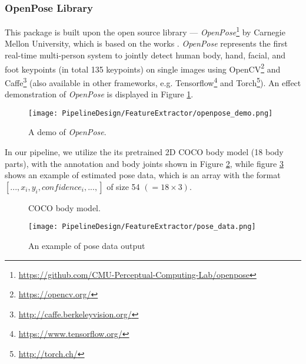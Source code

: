 \subsubsection{OpenPose Library}

This package is built upon the open source library --- \textit{OpenPose}\footnote{\label{git:openpose}\url{https://github.com/CMU-Perceptual-Computing-Lab/openpose}} by Carnegie Mellon University, which is based on the works \cite{cao2017realtime, DBLP:journals/corr/SimonJMS17, journals/corr/WeiRKS16}. \textit{OpenPose} represents the first real-time multi-person system to jointly detect human body, hand, facial, and foot keypoints (in total 135 keypoints) on single images using OpenCV\footnote{\url{https://opencv.org/}} and Caffe\footnote{\url{http://caffe.berkeleyvision.org/}} (also available in other frameworks, e.g. Tensorflow\footnote{\url{https://www.tensorflow.org/}} and Torch\footnote{\url{http://torch.ch/}}). An effect demonstration of \textit{OpenPose} is displayed in Figure \ref{fig:openpose_demo}. 

\begin{figure}[h!]
  \centering
  \texttt{[image: PipelineDesign/FeatureExtractor/openpose\_demo.png]}
  \caption{A demo of \textit{OpenPose}.}
  \label{fig:openpose_demo}
\end{figure} 


In our pipeline, we utilize the its pretrained 2D COCO body model (18 body parts), with the annotation and body joints shown in Figure \ref{fig:coco_model}, while figure \ref{fig:pose_data} shows an example of estimated pose data, which is an array with the format $[ ... , x_{i}, y_{i}, confidence_{i}, ... , ]$ of size 54 $(= 18 \times 3)$.

\begin{figure}[h!]
  \centering
  \caption{COCO body model.}
  \label{fig:coco_model}
\end{figure} 

\begin{figure}[H]
  \centering
  \texttt{[image: PipelineDesign/FeatureExtractor/pose\_data.png]}
  \caption{An example of pose data output}
  \label{fig:pose_data}
\end{figure} 

